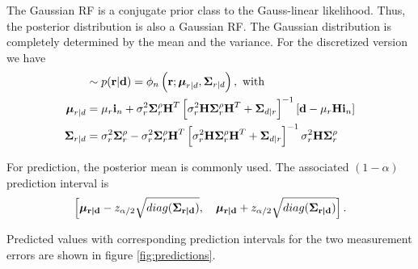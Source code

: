 The Gaussian RF is a conjugate prior class to the Gauss-linear likelihood. Thus, the posterior distribution is also a Gaussian RF. The Gaussian distribution is completely determined by the mean and the variance. For the discretized version we have
\begin{align*}
    [\vect{r}|\vect{d}] &\sim p(\vect{r}|\vect{d}) = \phi_n\left(\vect{r};\vect{\mu}_{r|d}, \matr{\Sigma}_{r|d}\right), \text{ with }\\
    \vect{\mu}_{r|d} &= \mu_r\vect{i}_n + \sigma^2_r\matr\Sigma^{\rho}_r\matr{H}^T \left[\sigma^2_r\matr{H}\matr\Sigma^{\rho}_r\matr{H}^T + \matr{\Sigma}_{d|r}\right]^{-1}[\vect{d}-\mu_r\matr{H}\vect{i}_n]\\
    \matr{\Sigma}_{r|d} &= \sigma^2_r\matr\Sigma^{\rho}_r - \sigma^2_r\matr\Sigma^{\rho}_r\matr{H}^T \left[\sigma^2_r\matr{H}\matr\Sigma^{\rho}_r\matr{H}^T + \matr{\Sigma}_{d|r}\right]^{-1} \sigma^2_r\matr{H} \matr\Sigma^{\rho}_r
\end{align*}

For prediction, the posterior mean is commonly used. The associated $(1-\alpha)$ prediction interval is 
$$\left[\boldsymbol{\mathbf{\mu_{r|d}}}-z_{\alpha/2} \sqrt{diag(\boldsymbol{\mathbf{\Sigma_{r|d}}})},\quad \boldsymbol{\mathbf{\mu_{r|d}}}+z_{\alpha/2} \sqrt{diag(\boldsymbol{\mathbf{\Sigma_{r|d}}})}\right].$$

Predicted values with corresponding prediction intervals for the two measurement errors are shown in figure \ref{fig:predictions}.

